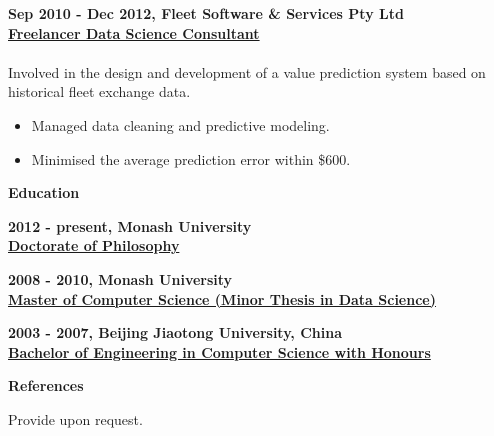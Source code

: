 \documentclass[a4paper,8pt,final]{memoir}
\newcommand{\Sep}{\vspace{1.5em}}
\newcommand{\SmallSep}{\vspace{0.5em}}
\newcommand{\CVSection}[1]
	{\Large\textbf{#1}\par
	\SmallSep\normalsize\normalfont}
\newcommand{\CVItem}[1]
	{\textbf{\color{RoyalBlue} #1}}
\begin{document}
\CVItem{Sep 2010 - Dec 2012, Fleet Software \& Services Pty Ltd}\\
\underline{\textbf{Freelancer Data Science Consultant}}\\
\\
Involved in the design and development of a value prediction system based on historical fleet exchange data.
    \begin{itemize}
        \item Managed data cleaning and predictive modeling.
        \item Minimised the average prediction error within \$600.
    \end{itemize}
\Sep
\Sep
\Sep
\CVSection{Education}
\CVItem{2012 - present, Monash University}\\
\underline{\textbf{Doctorate of Philosophy}}
\Sep

\CVItem{2008 - 2010, Monash University}\\
\underline{\textbf{Master of Computer Science (Minor Thesis in Data Science)}}
\Sep

\CVItem{2003 - 2007, Beijing Jiaotong University, China}\\
\underline{\textbf{Bachelor of Engineering in Computer Science with Honours}}
\Sep
\Sep
\Sep

\CVSection{References}
Provide upon request.
%
%
%
\end{document}
